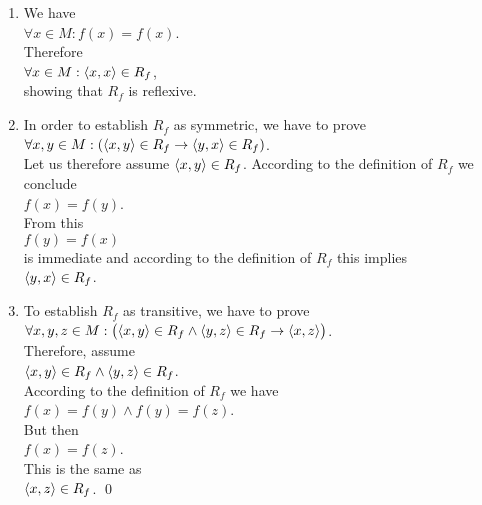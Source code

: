 \begin{enumerate}
\item We have
      \\[0.2cm]
      \hspace*{1.3cm}
      $\forall x \in M: f(x) = f(x)$.
      \\[0.2cm]
      Therefore
      \\[0.2cm]
      \hspace*{1.3cm}
      $\forall x \in M: \pair(x,x) \in R_f$,
      \\[0.2cm]
      showing that $R_f$ is reflexive.
\item In order to establish $R_f$ as symmetric, we have to prove
      \\[0.2cm]
      \hspace*{1.3cm}
      $\forall x,y \in M: (\pair(x,y) \in R_f \rightarrow \pair(y,x) \in R_f)$.
      \\[0.2cm]
      Let us  therefore assume $\pair(x,y) \in R_f$.  According to the definition of $R_f$ we conclude
      \\[0.2cm]
      \hspace*{1.3cm}
      $f(x) = f(y)$.
      \\[0.2cm]
      From this 
      \\[0.2cm]
      \hspace*{1.3cm}
      $f(y) = f(x)$
      \\[0.2cm]
      is immediate and according to the definition of $R_f$ this implies 
      \\[0.2cm]
      \hspace*{1.3cm}
      $\pair(y,x) \in R_f$.
\item To establish $R_f$ as transitive, we have to prove
      \\[0.2cm]
      \hspace*{1.3cm}
      $\forall x,y,z \in M: \bigl(\pair(x,y) \in R_f \wedge \pair(y,z) \in R_f \rightarrow \pair(x,z)\bigr)$.
      \\[0.2cm]
      Therefore, assume 
      \\[0.2cm]
      \hspace*{1.3cm}
      $\pair(x,y) \in R_f \wedge \pair(y,z) \in R_f$.
      \\[0.2cm]
      According to the definition of $R_f$ we have 
      \\[0.2cm]
      \hspace*{1.3cm}
      $f(x) = f(y) \wedge f(y) = f(z)$.
      \\[0.2cm]
      But then 
      \\[0.2cm]
      \hspace*{1.3cm}
      $f(x) = f(z)$.
      \\[0.2cm]
      This is the same as 
      \\[0.2cm]
      \hspace*{1.3cm}
      $\pair(x,z) \in R_f$.  \qed
\end{enumerate}

